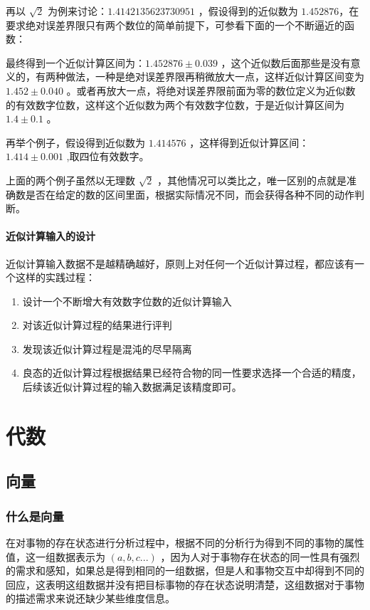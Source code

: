 \documentclass[12pt,oneside]{book}
\begin{document}
再以 $\sqrt{2}$ 为例来讨论：$ 1.4142135623730951 $ ，假设得到的近似数为 $ 1.452876 $，在要求绝对误差界限只有两个数位的简单前提下，可参看下面的一个不断逼近的函数：

最终得到一个近似计算区间为：$ 1.452876 \pm 0.039$ ，这个近似数后面那些是没有意义的，有两种做法，一种是绝对误差界限再稍微放大一点，这样近似计算区间变为 $ 1.452 \pm 0.040 $ 。或者再放大一点，将绝对误差界限前面为零的数位定义为近似数的有效数字位数，这样这个近似数为两个有效数字位数，于是近似计算区间为 $ 1.4 \pm 0.1 $ 。

再举个例子，假设得到近似数为 $ 1.414576 $ ，这样得到近似计算区间：$ 1.414 \pm 0.001 $ ,取四位有效数字。

上面的两个例子虽然以无理数 $ \sqrt{2} $ ，其他情况可以类比之，唯一区别的点就是准确数是否在给定的数的区间里面，根据实际情况不同，而会获得各种不同的动作判断。

\subsection{近似计算输入的设计}
近似计算输入数据不是越精确越好，原则上对任何一个近似计算过程，都应该有一个这样的实践过程：

\begin{enumerate}
\item 设计一个不断增大有效数字位数的近似计算输入
\item 对该近似计算过程的结果进行评判
\item 发现该近似计算过程是混沌的尽早隔离
\item 良态的近似计算过程根据结果已经符合物的同一性要求选择一个合适的精度，后续该近似计算过程的输入数据满足该精度即可。
\end{enumerate}




\part{代数}
\chapter{向量}
\section{什么是向量}
在对事物的存在状态进行分析过程中，根据不同的分析行为得到不同的事物的属性值，这一组数据表示为 $(a, b, c...)$ ，因为人对于事物存在状态的同一性具有强烈的需求和感知，如果总是得到相同的一组数据，但是人和事物交互中却得到不同的回应，这表明这组数据并没有把目标事物的存在状态说明清楚，这组数据对于事物的描述需求来说还缺少某些维度信息。
\end{document}
